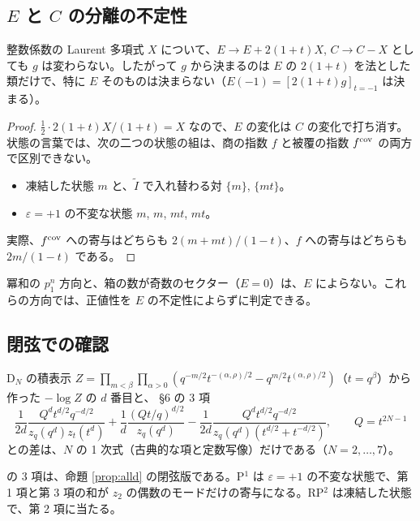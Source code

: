 \subsection{$E$ と $C$ の分離の不定性}
\begin{proposition}\label{prop:EC}
整数係数の Laurent 多項式 $X$ について、$E \to E + 2(1+t)X$, $C \to C - X$ としても $g$ は変わらない。したがって $g$ から決まるのは $E$ の $2(1+t)$ を法とした類だけで、特に $E$ そのものは決まらない（$E(-1) = [2(1+t)g]_{t=-1}$ は決まる）。
\end{proposition}
\begin{proof}
$\tfrac12 \cdot 2(1+t)X/(1+t) = X$ なので、$E$ の変化は $C$ の変化で打ち消す。
状態の言葉では、次の二つの状態の組は、商の指数 $f$ と被覆の指数 $f^{\mathrm{cov}}$ の両方で区別できない。
\begin{itemize}
\item 凍結した状態 $m$ と、$\tilde I$ で入れ替わる対 $\{m\}$, $\{mt\}$。
\item $\varepsilon = +1$ の不変な状態 $m$, $m$, $mt$, $mt$。
\end{itemize}
実際、$f^{\mathrm{cov}}$ への寄与はどちらも $2(m + mt)/(1-t)$、$f$ への寄与はどちらも $2m/(1-t)$ である。
\end{proof}

\begin{corollary}\label{cor:Efree}
冪和の $p_1^n$ 方向と、箱の数が奇数のセクター（$E = 0$）は、$E$ によらない。これらの方向では、正値性を $E$ の不定性によらずに判定できる。
\end{corollary}

\subsection{閉弦での確認}
\begin{compresult}\label{cr:closed}
D$_N$ の積表示 $Z = \prod_{m<\beta}\prod_{\alpha>0}(q^{-m/2}t^{-(\alpha,\rho)/2} - q^{m/2}t^{(\alpha,\rho)/2})$（$t = q^\beta$）から作った $-\log Z$ の $d$ 番目と、\cite{AgSc12} §6 の 3 項
\[
\frac{1}{2d}\frac{Q^d t^{d/2} q^{-d/2}}{z_q(q^d) z_t(t^d)} + \frac1d \frac{(Q t/q)^{d/2}}{z_q(q^d)} - \frac{1}{2d}\frac{Q^d t^{d/2}q^{-d/2}}{z_q(q^d)(t^{d/2} + t^{-d/2})},\qquad Q = t^{2N-1}
\]
との差は、$N$ の 1 次式（古典的な項と定数写像）だけである（$N = 2, \dots, 7$）。
\end{compresult}
\cite{AgSc12} の 3 項は、命題 \ref{prop:alld} の閉弦版である。P$^1$ は $\varepsilon = +1$ の不変な状態で、第 1 項と第 3 項の和が $z_2$ の偶数のモードだけの寄与になる。RP$^2$ は凍結した状態で、第 2 項に当たる。

